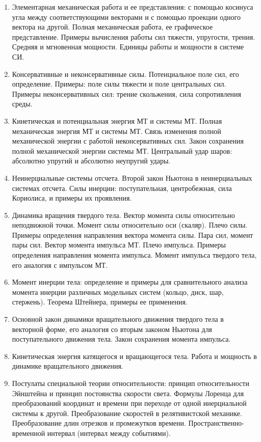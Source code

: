 \documentclass[12pt]{article}
\begin{document}
\begin{enumerate}
        \item Элементарная механическая работа и ее представления: с помощью косинуса угла между соответствующими векторами и с помощью проекции одного вектора на другой. Полная механическая работа, ее графическое представление. Примеры вычисления работы сил тяжести, упругости, трения. Средняя и мгновенная мощности. Единицы работы и мощности в системе СИ.
        \item Консервативные и неконсервативные силы. Потенциальное поле сил, его определение. Примеры: поле силы тяжести и поле центральных сил. Примеры неконсервативных сил: трение скольжения, сила сопротивления среды.
        \item Кинетическая и потенциальная энергия МТ и системы МТ. Полная механическая энергия МТ и системы МТ. Связь изменения полной механической энергии с работой неконсервативных сил. Закон сохранения полной механической энергии системы МТ. Центральный удар шаров: абсолютно упругий и абсолютно неупругий удары.
        \item Неинерциальные системы отсчета. Второй закон Ньютона в неинерциальных системах отсчета. Силы инерции: поступательная, центробежная, сила Кориолиса, и примеры их проявления.
        \item Динамика вращения твердого тела. Вектор момента силы относительно неподвижной точки. Момент силы относительно оси (скаляр). Плечо силы. Примеры определения направления вектора момента силы. Пара сил, момент пары сил. Вектор момента импульса МТ. Плечо импульса. Примеры определения направления момента импульса. Момент импульса твердого тела, его аналогия с импульсом МТ.
        \item Момент инерции тела: определение и примеры для сравнительного анализа момента инерции различных модельных систем (кольцо, диск, шар, стержень). Теорема Штейнера, примеры ее применения.
        \item Основной закон динамики вращательного движения твердого тела в векторной форме, его аналогия со вторым законом Ньютона для поступательного движения тела. Закон сохранения момента импульса.
        \item Кинетическая энергия катящегося и вращающегося тела. Работа и мощность в динамике вращательного движения.
        \item Постулаты специальной теории относительности: принцип относительности Эйнштейна и принцип постоянства скорости света. Формулы Лоренца для преобразований координат и времени при переходе от одной инерциальной системы к другой. Преобразование скоростей в релятивистской механике. Преобразование длин отрезков и промежутков времени. Пространственно-временной интервал (интервал между событиями).

\end{enumerate}
\end{document}
